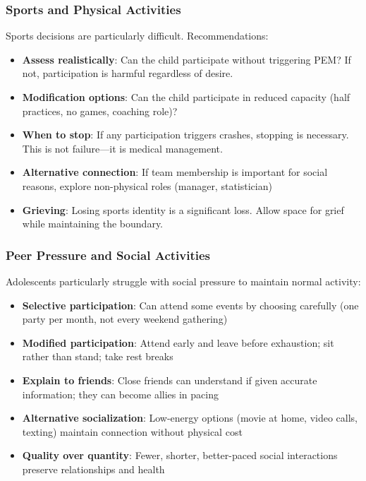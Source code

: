 \subsubsection{Sports and Physical Activities}

Sports decisions are particularly difficult. Recommendations:

\begin{itemize}
    \item \textbf{Assess realistically}: Can the child participate without triggering PEM? If not, participation is harmful regardless of desire.
    \item \textbf{Modification options}: Can the child participate in reduced capacity (half practices, no games, coaching role)?
    \item \textbf{When to stop}: If any participation triggers crashes, stopping is necessary. This is not failure---it is medical management.
    \item \textbf{Alternative connection}: If team membership is important for social reasons, explore non-physical roles (manager, statistician)
    \item \textbf{Grieving}: Losing sports identity is a significant loss. Allow space for grief while maintaining the boundary.
\end{itemize}

\subsubsection{Peer Pressure and Social Activities}

Adolescents particularly struggle with social pressure to maintain normal activity:

\begin{itemize}
    \item \textbf{Selective participation}: Can attend some events by choosing carefully (one party per month, not every weekend gathering)
    \item \textbf{Modified participation}: Attend early and leave before exhaustion; sit rather than stand; take rest breaks
    \item \textbf{Explain to friends}: Close friends can understand if given accurate information; they can become allies in pacing
    \item \textbf{Alternative socialization}: Low-energy options (movie at home, video calls, texting) maintain connection without physical cost
    \item \textbf{Quality over quantity}: Fewer, shorter, better-paced social interactions preserve relationships and health
\end{itemize}

